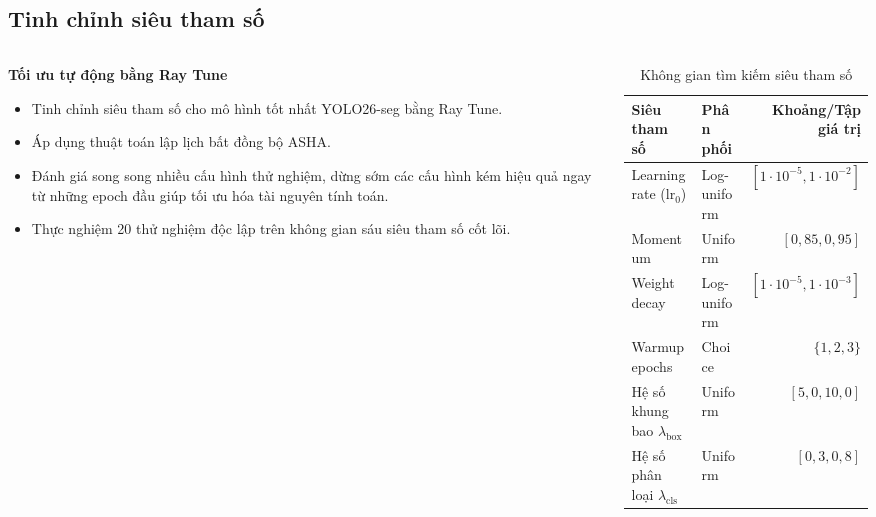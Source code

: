 \subsection{Tinh chỉnh siêu tham số}
\begin{frame}
    \begin{columns}[T]
        \begin{column}{0.48\textwidth}
            \justifying
            \centerline{\textbf{Tối ưu tự động bằng Ray Tune}}
            \vspace{0.2cm}
            \footnotesize
            \begin{itemize}
                \setlength{\itemsep}{3pt}
                \item Tinh chỉnh siêu tham số cho mô hình tốt nhất YOLO26-seg bằng Ray Tune.
                \item Áp dụng thuật toán lập lịch bất đồng bộ ASHA.
                \item Đánh giá song song nhiều cấu hình thử nghiệm, dừng sớm các cấu hình kém hiệu quả ngay từ những epoch đầu giúp tối ưu hóa tài nguyên tính toán.
                \item Thực nghiệm 20 thử nghiệm độc lập trên không gian sáu siêu tham số cốt lõi.
            \end{itemize}
        \end{column}
        \begin{column}{0.48\textwidth}
            \centering
            \vspace{0.15cm}
            \begin{table}[h]
                \centering
                \caption{Không gian tìm kiếm siêu tham số}
                \label{tab:slide_raytune_space}
                \scriptsize
                \setlength{\tabcolsep}{3pt}
                \begin{tabular}{llr}
                    \toprule
                    Siêu tham số                           & Phân phối   & Khoảng/Tập giá trị                   \\
                    \midrule
                    Learning rate ($\text{lr}_0$)          & Log-uniform & $[1 \cdot 10^{-5}, 1 \cdot 10^{-2}]$ \\
                    Momentum                               & Uniform     & $[0,85, 0,95]$                       \\
                    Weight decay                           & Log-uniform & $[1 \cdot 10^{-5}, 1 \cdot 10^{-3}]$ \\
                    Warmup epochs                          & Choice      & $\{1, 2, 3\}$                        \\
                    Hệ số khung bao $\lambda_{\text{box}}$ & Uniform     & $[5,0, 10,0]$                        \\
                    Hệ số phân loại $\lambda_{\text{cls}}$ & Uniform     & $[0,3, 0,8]$                         \\
                    \bottomrule
                \end{tabular}
            \end{table}
        \end{column}
    \end{columns}
\end{frame}
